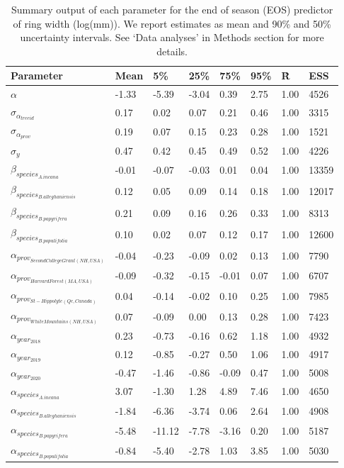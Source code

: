 \documentclass{article}\usepackage[]{graphicx}\usepackage[]{xcolor}
\begin{document}
\begin{table}[ht]
\centering
\caption{Summary output of each parameter for the end of season (EOS) predictor of ring width (log(mm)). We report estimates as mean and 90\% and 50\% uncertainty intervals. See `Data analyses' in Methods section for more details.} 
\label{tab:tab_EOS}
\begin{tabular}{llllllll}
  \hline
Parameter & Mean & 5\% & 25\% & 75\% & 95\% & \^R & ESS \\ 
  \hline
$\alpha$ & -1.33 & -5.39 & -3.04 & 0.39 & 2.75 & 1.00 & 4526 \\ 
  $\sigma_{\alpha_{treeid}}$ & 0.17 & 0.02 & 0.07 & 0.21 & 0.46 & 1.00 & 3315 \\ 
  $\sigma_{\alpha_{prov}}$ & 0.19 & 0.07 & 0.15 & 0.23 & 0.28 & 1.00 & 1521 \\ 
  $\sigma_{y}$ & 0.47 & 0.42 & 0.45 & 0.49 & 0.52 & 1.00 & 4226 \\ 
  $\beta_{species_{A. incana}}$ & -0.01 & -0.07 & -0.03 & 0.01 & 0.04 & 1.00 & 13359 \\ 
  $\beta_{species_{B. alleghaniensis}}$ & 0.12 & 0.05 & 0.09 & 0.14 & 0.18 & 1.00 & 12017 \\ 
  $\beta_{species_{B. papyrifera}}$ & 0.21 & 0.09 & 0.16 & 0.26 & 0.33 & 1.00 & 8313 \\ 
  $\beta_{species_{B. populifolia}}$ & 0.10 & 0.02 & 0.07 & 0.12 & 0.17 & 1.00 & 12600 \\ 
  $\alpha_{prov_{Second College Grant (NH, USA)}}$ & -0.04 & -0.23 & -0.09 & 0.02 & 0.13 & 1.00 & 7790 \\ 
  $\alpha_{prov_{Harvard Forest (MA, USA)}}$ & -0.09 & -0.32 & -0.15 & -0.01 & 0.07 & 1.00 & 6707 \\ 
  $\alpha_{prov_{St-Hippolyte (Qc, Canada)}}$ & 0.04 & -0.14 & -0.02 & 0.10 & 0.25 & 1.00 & 7985 \\ 
  $\alpha_{prov_{White Mountains (NH, USA)}}$ & 0.07 & -0.09 & 0.00 & 0.13 & 0.28 & 1.00 & 7423 \\ 
  $\alpha_{year_{2018}}$ & 0.23 & -0.73 & -0.16 & 0.62 & 1.18 & 1.00 & 4932 \\ 
  $\alpha_{year_{2019}}$ & 0.12 & -0.85 & -0.27 & 0.50 & 1.06 & 1.00 & 4917 \\ 
  $\alpha_{year_{2020}}$ & -0.47 & -1.46 & -0.86 & -0.09 & 0.47 & 1.00 & 5008 \\ 
  $\alpha_{species_{A. incana}}$ & 3.07 & -1.30 & 1.28 & 4.89 & 7.46 & 1.00 & 4650 \\ 
  $\alpha_{species_{B. alleghaniensis}}$ & -1.84 & -6.36 & -3.74 & 0.06 & 2.64 & 1.00 & 4908 \\ 
  $\alpha_{species_{B. papyrifera}}$ & -5.48 & -11.12 & -7.78 & -3.16 & 0.20 & 1.00 & 5187 \\ 
  $\alpha_{species_{B. populifolia}}$ & -0.84 & -5.40 & -2.78 & 1.03 & 3.85 & 1.00 & 5030 \\ 
   \hline
\end{tabular}
\end{table}
\end{document}
